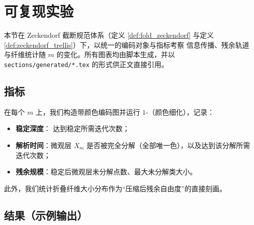 \section{可复现实验}\label{sec:experiments}

本节在 Zeckendorf 截断规范体系（定义 \ref{def:fold_zeckendorf} 与定义 \ref{def:zeckendorf_trellis}）下，以统一的编码对象与指标考察 \WL{} 信息传播、残余轨道与纤维统计随 $m$ 的变化。所有图表均由脚本生成，并以 \texttt{sections/generated/*.tex} 的形式供正文直接引用。

\subsection{指标}

在每个 $m$ 上，我们构造带颜色编码图并运行 $1$-\WL{}（颜色细化），记录：
\begin{itemize}
  \item \textbf{稳定深度}：\WL{} 达到稳定所需迭代次数；
  \item \textbf{解析时间}：微观层 $X_m$ 是否被完全分解（全部唯一色），以及达到该分解所需迭代次数；
  \item \textbf{残余规模}：稳定后微观层未分解点数、最大未分解类大小。
\end{itemize}
此外，我们统计折叠纤维大小分布作为“压缩后残余自由度”的直接刻画。

\subsection{结果（示例输出）}













